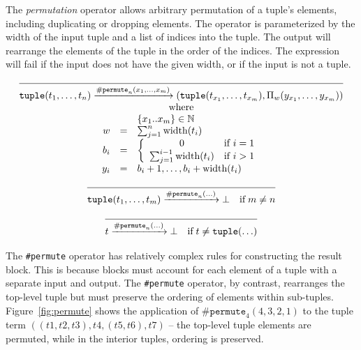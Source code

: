 The \emph{permutation} operator allows arbitrary permutation of a
tuple's elements, including duplicating or dropping elements. The
operator is parameterized by the width of the input tuple and a
list of indices into the tuple. The output will rearrange the
elements of the tuple in the order of the indices. The expression
will fail if the input does not have the given width, or if the
input is not a tuple.

\begin{equation}
\begin{array}{c}
\infer
  {\mathtt{tuple}(t_1,\ldots,t_n) \arr{\mathtt{\#permute}_n(x_1,\ldots,x_m)} (\mathtt{tuple}(t_{x_1},\ldots,t_{x_m}),\Pi_w(y_{x_1},\ldots,y_{x_m}))}{}\\
\mbox{where}\\
\begin{array}{rll}
    & & \{x_1..x_m\} \in \mathbb{N}\\
w   &=& \sum_{j=1}^n \mbox{width}(t_i)\\
b_i &=& \left\{
  \begin{array}{cl}
    0 & \mbox{if } i = 1\\
    \sum_{j=1}^{i-1} \mbox{width}(t_i) & \mbox{if } i > 1
  \end{array}
\right.\\
y_i &=& b_i+1,\ldots,b_i + \mbox{width}(t_i)
\end{array}
\end{array}
\end{equation}

\begin{equation}
\infer
  {\mathtt{tuple}(t_1,\ldots,t_m) \arr{\#\mathtt{permute}_n(\ldots)} \bot
  \quad\mbox{if}\; m \neq n}
  {}  
\end{equation}

\begin{equation}
\infer
  {t \arr{\#\mathtt{permute}_n(\ldots)} \bot
  \quad\mbox{if}\; t \neq \mathtt{tuple}(\ldots)}
  {}  
\end{equation}

The \texttt{\#permute} operator has relatively complex rules for constructing
the result block. This is because blocks must account for each element of a
tuple with a separate input and output. The \texttt{\#permute} operator, by
contrast, rearranges the top-level tuple but must preserve the ordering of
elements within sub-tuples. Figure~\ref{fig:permute} shows the application of
$\mathtt{\#permute}_4(4,3,2,1)$ to the tuple term $((t1,t2,t3),t4,(t5,t6),t7)$
-- the top-level tuple elements are permuted, while in the interior tuples,
ordering is preserved.

